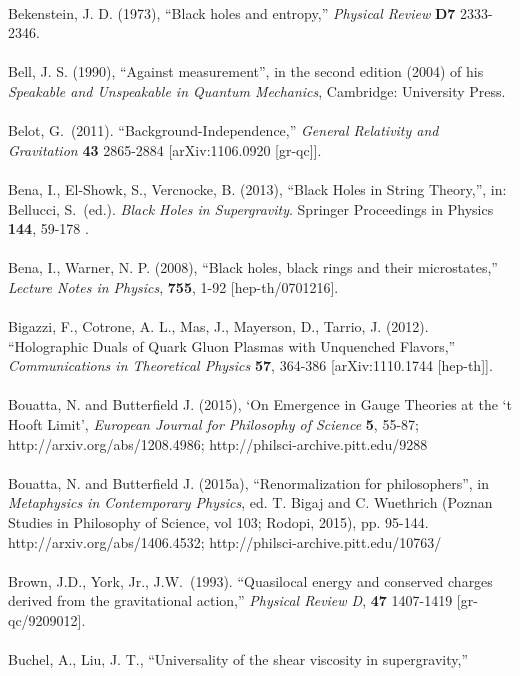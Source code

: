 \documentclass[12pt]{article}
\renewcommand{\^}[1]{\hat{#1}}
\begin{document}
\\
Bekenstein, J. D. (1973), ``Black holes and entropy,'' {\it Physical Review} \textbf{D7} 2333-2346. \\
\\
Bell, J. S. (1990), ``Against measurement'', in the second edition (2004) of his {\em Speakable and Unspeakable in Quantum Mechanics}, Cambridge: University Press.  \\
\\
Belot, G.~(2011). ``Background-Independence,''  {\it General Relativity and Gravitation}  {\bf 43} 2865-2884 
  [arXiv:1106.0920 [gr-qc]].\\
\\
Bena, I., El-Showk, S., Vercnocke, B. (2013), ``Black Holes in String Theory,'', in: Bellucci, S.~(ed.). {\it Black Holes in Supergravity}.  Springer Proceedings in Physics  {\bf 144}, 59-178 .\\
\\
Bena, I., Warner, N. P. (2008), ``Black holes, black rings and their microstates,''
  {\it Lecture Notes in Physics},  {\bf 755}, 1-92 
  [hep-th/0701216].\\
\\
Bigazzi, F., Cotrone, A. L., Mas, J., Mayerson, D., Tarrio, J. (2012). ``Holographic Duals of Quark Gluon Plasmas with Unquenched Flavors,''
  {\it Communications in Theoretical Physics}  {\bf 57}, 364-386 
  [arXiv:1110.1744 [hep-th]].\\
  \\
Bouatta, N. and Butterfield J. (2015), `On Emergence in Gauge Theories at the `t Hooft Limit', {\it European Journal for
Philosophy of Science} {\bf 5}, 55-87; http://arxiv.org/abs/1208.4986; http://philsci-archive.pitt.edu/9288 \\
\\
Bouatta, N. and Butterfield J. (2015a), ``Renormalization for philosophers'', in {\it Metaphysics in Contemporary Physics}, ed. T. Bigaj and C. Wuethrich (Poznan Studies in Philosophy of Science, vol 103; Rodopi, 2015), pp. 95-144.
http://arxiv.org/abs/1406.4532; http://philsci-archive.pitt.edu/10763/ \\
\\
Brown, J.D., York, Jr., J.W.~(1993). ``Quasilocal energy and conserved charges derived from the gravitational action,''
  {\it Physical Review D}, {\bf 47} 1407-1419 
  [gr-qc/9209012].\\
\\
Buchel, A., Liu, J. T., ``Universality of the shear viscosity in supergravity,''
\end{document}
